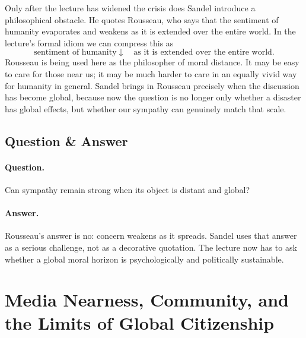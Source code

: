Only after the lecture has widened the crisis does Sandel introduce a philosophical obstacle. He quotes Rousseau, who says that the sentiment of humanity evaporates and weakens as it is extended over the entire world. In the lecture's formal idiom we can compress this as
\begin{equation}
\text{sentiment of humanity}
\downarrow
\quad \text{as it is extended over the entire world}.
\end{equation}
Rousseau is being used here as the philosopher of moral distance. It may be easy to care for those near us; it may be much harder to care in an equally vivid way for humanity in general. Sandel brings in Rousseau precisely when the discussion has become global, because now the question is no longer only whether a disaster has global effects, but whether our sympathy can genuinely match that scale.

\subsection{Question \& Answer}

\paragraph{Question.} Can sympathy remain strong when its object is distant and global?

\paragraph{Answer.} Rousseau's answer is no: concern weakens as it spreads. Sandel uses that answer as a serious challenge, not as a decorative quotation. The lecture now has to ask whether a global moral horizon is psychologically and politically sustainable.

\section{Media Nearness, Community, and the Limits of Global Citizenship}

